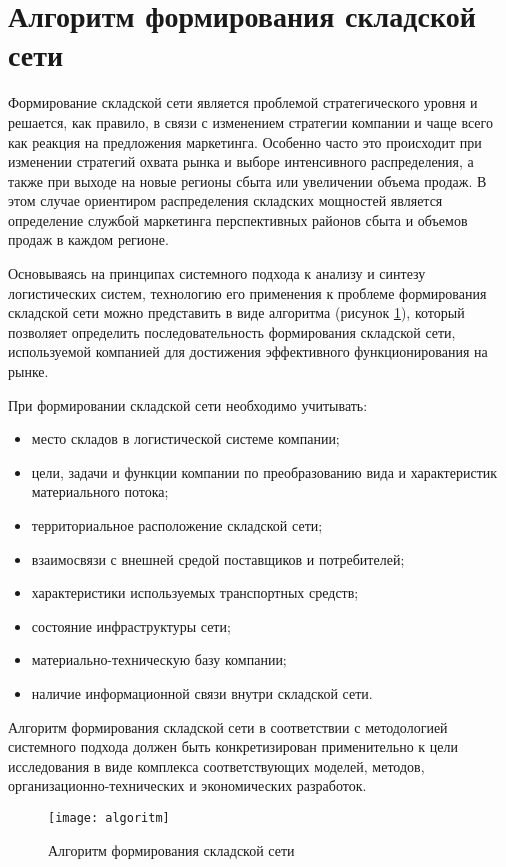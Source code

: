 \section{Алгоритм формирования складской сети}

Формирование складской сети является проблемой стратегического уровня и решается, как правило, в связи с изменением стратегии компании и чаще всего как реакция на предложения маркетинга.
Особенно часто это происходит при изменении стратегий охвата рынка и выборе интенсивного распределения, а также при выходе на новые регионы сбыта или увеличении объема продаж.
В этом случае ориентиром распределения складских мощностей является определение службой маркетинга перспективных районов сбыта и объемов продаж в каждом регионе.

Основываясь на принципах системного подхода к анализу и синтезу логистических систем, технологию его применения к проблеме формирования складской сети можно представить в виде алгоритма (рисунок \ref{fig:algoritm}), который позволяет определить последовательность формирования складской сети, используемой компанией для достижения эффективного функционирования на рынке.


При формировании складской сети необходимо учитывать:
\begin{itemize}
	\item место складов в логистической системе компании;
	\item цели, задачи и функции компании по преобразованию вида и характеристик материального потока;
	\item территориальное расположение складской сети;
	\item взаимосвязи с внешней средой поставщиков и потребителей;
	\item характеристики используемых транспортных средств;
	\item состояние инфраструктуры сети;
	\item материально-техническую базу компании;
	\item наличие информационной связи внутри складской сети.
\end{itemize}

Алгоритм формирования складской сети в соответствии с методологией системного подхода должен быть конкретизирован применительно к цели исследования в виде комплекса соответствующих моделей, методов, организационно-технических и экономических разработок.

\begin{figure}[h]
	\centering
	\texttt{[image: algoritm]}
	\caption{Алгоритм формирования складской сети}
	\label{fig:algoritm}
\end{figure}

